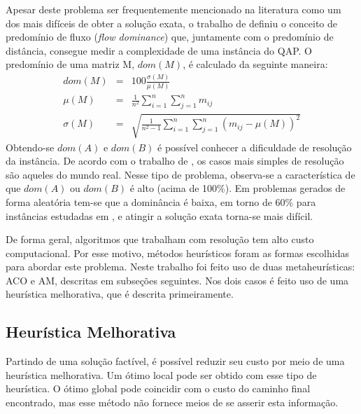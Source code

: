Apesar deste problema ser frequentemente mencionado na literatura como
um dos mais difíceis de obter a solução exata, o trabalho de
\cite{dominance} definiu o conceito de predomínio de fluxo
(\textit{flow dominance}) que, juntamente com o predomínio de
distância, consegue medir a complexidade de uma instância do QAP. O
predomínio de uma matriz M, $dom(M)$, é calculado da seguinte maneira:
\begin{eqnarray}
dom(M) &=& 100 \frac{\sigma(M)}{\mu(M)} \\
\mu(M) &=& \frac{1}{n^2} \sum_{i=1}^n \sum_{j=1}^n m_{ij} \nonumber \\
\sigma(M) &=& \sqrt{\frac{1}{n^2 - 1} \sum_{i=1}^n \sum_{j=1}^n
(m_{ij} - \mu(M))^2} \nonumber
\end{eqnarray}
Obtendo-se $dom(A)$ e $dom(B)$ é possível conhecer a dificuldade de
resolução da instância. De acordo com o trabalho de \cite{taillard1},
os casos mais simples de resolução são aqueles do mundo real. Nesse
tipo de problema, observa-se a característica de que $dom(A)$ ou
$dom(B)$ é alto (acima de 100\%). Em problemas gerados de forma
aleatória tem-se que a dominância é baixa, em torno de 60\% para
instâncias estudadas em \cite{taillard1}, e atingir a solução exata
torna-se mais difícil.

De forma geral, algoritmos que trabalham com resolução tem alto custo
computacional. Por esse motivo, métodos heurísticos foram as formas
escolhidas para abordar este problema. Neste trabalho foi feito uso de
duas metaheurísticas: ACO e AM, descritas em subseções seguintes.
Nos dois casos é feito uso de uma heurística melhorativa, que é
descrita primeiramente.


\subsection{Heurística Melhorativa}

Partindo de uma solução factível, é possível reduzir seu custo por
meio de uma heurística melhorativa. Um ótimo local pode ser obtido com
esse tipo de heurística. O ótimo global pode coincidir com o custo do
caminho final encontrado, mas esse método não fornece meios de se
asserir esta informação.

